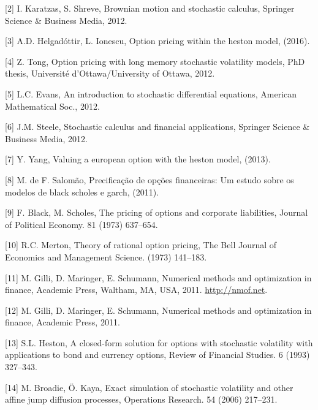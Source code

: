 \documentclass[12pt,twoside]{reedthesis}
\theoremstyle{definition}
\theoremstyle{definition}
\theoremstyle{remark}
\begin{document}
  \hypertarget{ref-karatzas2012brownian}{}
  {[}2{]} I. Karatzas, S. Shreve, Brownian motion and stochastic calculus,
  Springer Science \& Business Media, 2012.
  
  \hypertarget{ref-helgadottir2016option}{}
  {[}3{]} A.D. Helgadóttir, L. Ionescu, Option pricing within the heston
  model, (2016).
  
  \hypertarget{ref-tong2012option}{}
  {[}4{]} Z. Tong, Option pricing with long memory stochastic volatility
  models, PhD thesis, Université d'Ottawa/University of Ottawa, 2012.
  
  \hypertarget{ref-evans2012introduction}{}
  {[}5{]} L.C. Evans, An introduction to stochastic differential
  equations, American Mathematical Soc., 2012.
  
  \hypertarget{ref-steele2012stochastic}{}
  {[}6{]} J.M. Steele, Stochastic calculus and financial applications,
  Springer Science \& Business Media, 2012.
  
  \hypertarget{ref-yang2013valuing}{}
  {[}7{]} Y. Yang, Valuing a european option with the heston model,
  (2013).
  
  \hypertarget{ref-salomao2011precificaccao}{}
  {[}8{]} M. de F. Salomão, Precificação de opções financeiras: Um estudo
  sobre os modelos de black scholes e garch, (2011).
  
  \hypertarget{ref-black1973pricing}{}
  {[}9{]} F. Black, M. Scholes, The pricing of options and corporate
  liabilities, Journal of Political Economy. 81 (1973) 637--654.
  
  \hypertarget{ref-merton1973theory}{}
  {[}10{]} R.C. Merton, Theory of rational option pricing, The Bell
  Journal of Economics and Management Science. (1973) 141--183.
  
  \hypertarget{ref-nmof}{}
  {[}11{]} M. Gilli, D. Maringer, E. Schumann, Numerical methods and
  optimization in finance, Academic Press, Waltham, MA, USA, 2011.
  \url{http://nmof.net}.
  
  \hypertarget{ref-gilli_numerical_2011}{}
  {[}12{]} M. Gilli, D. Maringer, E. Schumann, Numerical methods and
  optimization in finance, Academic Press, 2011.
  
  \hypertarget{ref-heston1993closed}{}
  {[}13{]} S.L. Heston, A closed-form solution for options with stochastic
  volatility with applications to bond and currency options, Review of
  Financial Studies. 6 (1993) 327--343.
  
  \hypertarget{ref-broadie2006exact}{}
  {[}14{]} M. Broadie, Ö. Kaya, Exact simulation of stochastic volatility
  and other affine jump diffusion processes, Operations Research. 54
  (2006) 217--231.


\end{document}
